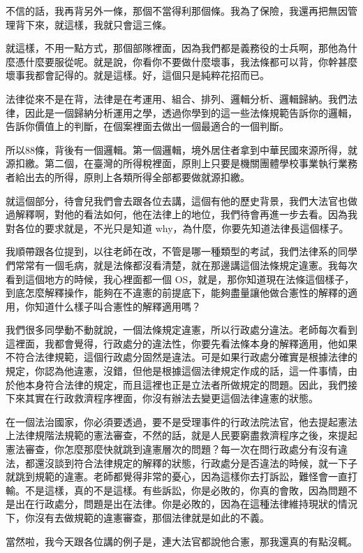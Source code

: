 \documentclass[oneside,sub3section]{ctexbook}
\begin{document}
不信的話，我再背另外一條，那個不當得利那個條。我為了保險，我還再把無因管理背下來，就這樣，我就只會這三條。

就這樣，不用一點方式，那個部隊裡面，因為我們都是義務役的士兵啊，那他為什麼憑什麼要服從呢。就是說，你看你不要做什麼壞事，我法條都可以背，你幹甚麼壞事我都會記得的。就是這樣。好，這個只是純粹花招而已。

法律從來不是在背，法律是在考運用、組合、排列、邏輯分析、邏輯歸納。我們法律，因此是一個歸納分析運用之學，透過你學到的這一些法條規範告訴你的邏輯，告訴你價值上的判斷，在個案裡面去做出一個最適合的一個判斷。

所以88條，背後有一個邏輯。第一個邏輯，境外居住者拿到中華民國來源所得，就源扣繳。第二個，在臺灣的所得稅裡面，原則上只要是機關團體學校事業執行業務者給出去的所得，原則上各類所得全部都要做就源扣繳。

就這個部分，待會兒我們會去跟各位去講，這個有他的歷史背景，我們大法官也做過解釋啊，對他的看法如何，他在法律上的地位，我們待會再進一步去看。因為我對各位的要求就是，不光只是知道 why，為什麼，你要先知道法律長這個樣子。

我順帶跟各位提到，以往老師在改，不管是哪一種類型的考試，我們法律系的同學們常常有一個毛病，就是法條都沒看清楚，就在那邊講這個法條規定違憲。我每次看到這個地方的時候，我心裡面都一個 OS，就是，那你知道現在法條這個樣子，到底怎麼解釋操作，能夠在不違憲的前提底下，能夠盡量讓他做合憲性的解釋的適用，你知道什么樣子叫合憲性的解釋適用嗎？

我們很多同學動不動就說，一個法條規定違憲，所以行政處分違法。老師每次看到這裡面，我都會覺得，行政處分的違法性，你要先看法條本身的解釋適用，他如果不符合法律規範，這個行政處分固然是違法。可是如果行政處分確實是根據法律的規定，你認為他違憲，沒錯，但他是根據這個法律規定作成的話，這一件事情，由於他本身符合法律的規定，而且這裡也正是立法者所做規定的問題。因此，我們接下來其實在行政救濟程序裡面，你沒有辦法去變更這個法律違憲的狀態。

在一個法治國家，你必須要透過，要不是受理事件的行政法院法官，他去提起憲法上法律規階法規範的憲法審查，不然的話，就是人民要窮盡救濟程序之後，來提起憲法審查，你怎麼那麼快就跳到違憲層次的問題？每一次在問行政處分有沒有違法，都還沒談到符合法律規定的解釋的狀態，行政處分是否違法的時候，就一下子就跳到規範的違憲。老師都覺得非常的憂心，因為這樣你去打訴訟，難怪會一直打輸。不是這樣，真的不是這樣。有些訴訟，你是必敗的，你真的會敗，因為問題不是出在行政處分，問題是出在法律。你是必敗的，因為在這種法律維持現狀的情況下，你沒有去做規範的違憲審查，那個法律就是如此的不義。

當然啦，我今天跟各位講的例子是，連大法官都說他合憲，那我還真的有點沒輒。
\end{document}
